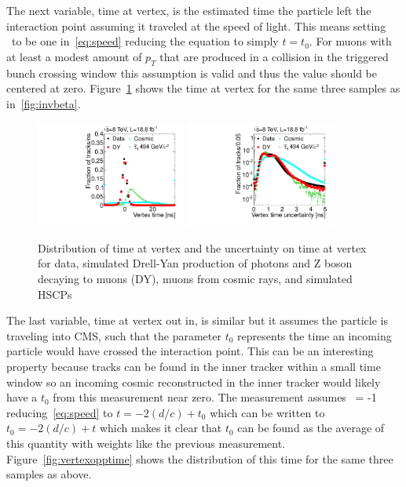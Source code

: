 The next variable, time at vertex, is the estimated time the particle 
left the interaction point assuming it traveled at the speed of light.
This means setting \invbeta\ to be one in~\ref{eq:speed} reducing the equation to simply $t = t_0$. 
For muons with at least a modest amount of $p_T$ that are produced in a collision in the triggered bunch crossing window this assumption is valid and thus the
value should be centered at zero. Figure~\ref{fig:vertextime} shows the time at vertex for the same three samples as in~\ref{fig:invbeta}.

\begin{figure}
  \begin{center}
      \includegraphics[width=0.44\textwidth]{figures/timing/Vertex}
      \includegraphics[width=0.44\textwidth]{figures/timing/VertexErr} \\
      \caption[Distribution of time at vertex and the uncertainty on time at vertex]
     {Distribution of time at vertex and the uncertainty on time at vertex for data,
simulated Drell-Yan production of photons and Z boson decaying to muons (DY), muons from cosmic rays, and simulated HSCPs
}
      \label{fig:vertextime}
  \end{center}
\end{figure}

The last variable, time at vertex out in, is similar but it assumes the particle is traveling into CMS, such that the parameter $t_0$ represents the time an incoming particle
would have crossed the interaction point. This can be an interesting property because tracks can be found in the inner tracker within a small time window so an incoming
cosmic reconstructed in the inner tracker would likely have a $t_0$ from this measurement near zero. 
The measurement assumes \invbeta\ = -1 reducing~\ref{eq:speed} to $t = -2 (d / c) + t_0$ which can be written to $t_0 = -2 (d / c) + t$ which makes it clear that
$t_0$ can be found as the average of this quantity with weights like the previous measurement. Figure~\ref{fig:vertexopptime} shows the distribution of this time
for the same three samples as above.

